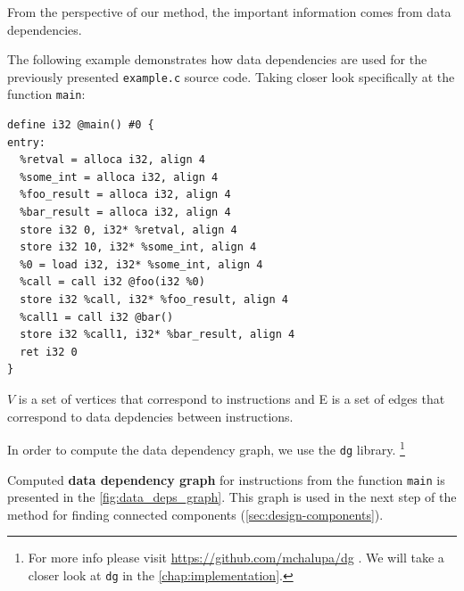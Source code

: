 \documentclass[12pt, twoside]{fithesis2}
\renewcommand{\_}{\leavevmode \kern0.07em\vbox{\hrule width0.4em}}
\begin{document}
From the perspective of our method, the important information comes from data
dependencies.

The following example demonstrates how data dependencies are used for the
previously presented \texttt{example.c} source code.
Taking closer look specifically at the function \texttt{main}:

\begin{verbatim}
define i32 @main() #0 {
entry:
  %retval = alloca i32, align 4
  %some_int = alloca i32, align 4
  %foo_result = alloca i32, align 4
  %bar_result = alloca i32, align 4
  store i32 0, i32* %retval, align 4
  store i32 10, i32* %some_int, align 4
  %0 = load i32, i32* %some_int, align 4
  %call = call i32 @foo(i32 %0)
  store i32 %call, i32* %foo_result, align 4
  %call1 = call i32 @bar()
  store i32 %call1, i32* %bar_result, align 4
  ret i32 0
}
\end{verbatim}

$V$ is a set of vertices that correspond to instructions and E is a set of
edges that correspond to data depdencies between instructions.

In order to compute the data dependency graph, we use the \texttt{dg} library.
\cite{dg}
\footnote{
For more info please visit \url{https://github.com/mchalupa/dg} \cite{dg}.
We will take a closer look at \texttt{dg} in the
\autoref{chap:implementation}.
}

Computed \textbf{data dependency graph} for instructions from the function
\texttt{main} is presented in the \autoref{fig:data_deps_graph}.
This graph is used in the next step of the method for finding
connected components (\autoref{sec:design-components}).
\end{document}

